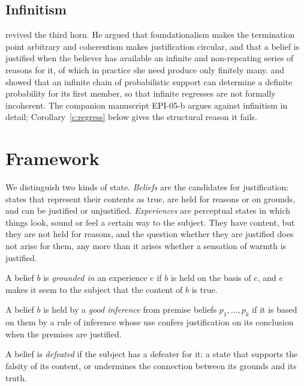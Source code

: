 \documentclass{situationist-preprint}
\begin{document}
\subsection{Infinitism}

\citet{Klein1999,Klein2007} revived the third horn. He argued that foundationalism makes the termination point arbitrary and coherentism makes justification circular, and that a belief is justified when the believer has available an infinite and non-repeating series of reasons for it, of which in practice she need produce only finitely many. \citet{Peijnenburg2007} and \citet{AtkinsonPeijnenburg2017} showed that an infinite chain of probabilistic support can determine a definite probability for its first member, so that infinite regresses are not formally incoherent. The companion manuscript EPI-05-b argues against infinitism in detail; Corollary~\ref{c:regress} below gives the structural reason it fails.

\section{Framework}\label{s:framework}

We distinguish two kinds of state. \emph{Beliefs} are the candidates for justification: states that represent their contents as true, are held for reasons or on grounds, and can be justified or unjustified. \emph{Experiences} are perceptual states in which things look, sound or feel a certain way to the subject. They have content, but they are not held for reasons, and the question whether they are justified does not arise for them, any more than it arises whether a sensation of warmth is justified.

\begin{definition}\label{d:ground}
A belief $b$ is \emph{grounded in} an experience $e$ if $b$ is held on the basis of $e$, and $e$ makes it seem to the subject that the content of $b$ is true.
\end{definition}

\begin{definition}\label{d:infer}
A belief $b$ is held by a \emph{good inference} from premise beliefs $p_1, \ldots, p_k$ if it is based on them by a rule of inference whose use confers justification on its conclusion when the premises are justified.
\end{definition}

\begin{definition}[Defeat]\label{d:defeat}
A belief is \emph{defeated} if the subject has a defeater for it: a state that supports the falsity of its content, or undermines the connection between its grounds and its truth.
\end{definition}
\end{document}
